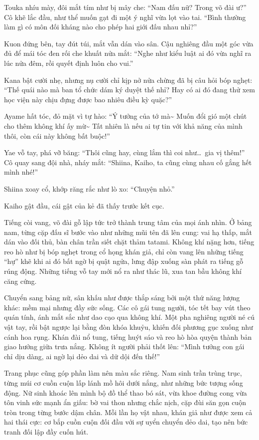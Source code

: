 \documentclass[../main.tex]{subfiles}
\begin{document}
Touka nhíu mày, đôi mắt tím như bị mây che: ``Nam đấu nữ? Trong võ đài ư?'' Cô khẽ lắc đầu, như thể muốn gạt đi một ý nghĩ vừa lọt vào tai. ``Bình thường làm gì có môn đối kháng nào cho phép hai giới đấu  nhau nhỉ?''

Kuon đứng bên, tay đút túi, mắt vẫn dán vào sân. Cậu nghiêng đầu một góc vừa đủ để mái tóc đen rối che khuất nửa mắt: ``Nghe như kiểu luật ai đó vừa nghĩ ra lúc nửa đêm, rồi quyết định luôn cho vui.''

Kana bật cười nhẹ, nhưng nụ cười chỉ kịp nở nửa chừng đã bị câu hỏi bóp nghẹt: ``Thế quái nào mà ban tổ chức dám ký duyệt thế nhỉ? Hay có ai đó đang thử xem học viện này chịu đựng được bao nhiêu điều kỳ quặc?''

Ayame hất tóc, đỏ mặt vì tự hào: ``Ý tưởng của tớ mà\~{} Muốn đổi gió một chút cho thêm không khí ấy mừ\~{} Tất nhiên là nếu ai tự tin với khả năng của mình thôi, còn cái này không bất buộc!''

Yae vỗ tay, phá vỡ băng: ``Thôi cũng hay, cùng lắm thì coi như\dots\ gia vị thêm!'' Cô quay sang đội nhà, nháy mắt: ``Shiina, Kaiho, ta cũng cùng nhau cố gắng hết mình nhé!''

Shiina xoay cổ, khớp răng rắc như lò xo: ``Chuyện nhỏ.''

Kaiho gật đầu, cái gật của kẻ đã thấy trước kết cục.

\ct

Tiếng còi vang, võ đài gỗ lập tức trở thành trung tâm của mọi ánh nhìn. Ở bảng nam, từng cặp đấu sĩ bước vào như những mũi tên đã lên cung: vai hạ thấp, mắt dán vào đối thủ, bàn chân trần siết chặt thảm tatami. Không khí nặng hơn, tiếng reo hò như bị bóp nghẹt trong cổ họng khán giả, chỉ còn vang lên những tiếng ``hự'' khẽ khi ai đó bất ngờ bị quật ngửa, lưng đập xuống sàn phát ra tiếng gỗ rúng động. Những tiếng vỗ tay mới nổ ra như thác lũ, xua tan bầu không khí căng cứng.

Chuyển sang bảng nữ, sân khấu như được thắp sáng bởi một thứ năng lượng khác: mềm mại nhưng đầy sức sống. Các cô gái tung người, tóc tết bay vút theo quán tính, ánh mắt sắc như dao cạo qua không khí. Một pha nghiêng người né cú vật tay, rồi bật ngược lại bằng đòn khóa khuỷu, khiến đối phương gục xuống như cánh hoa rụng. Khán đài nổ tung, tiếng huýt sáo và reo hò hòa quyện thành bản giao hưởng giữa trưa nắng. Không ít người phải thốt lên: ``Mình tưởng con gái chỉ dịu dàng, ai ngờ lại dẻo dai và dữ dội đến thế!''

Trang phục cũng góp phần làm nên màu sắc riêng. Nam sinh trần trùng trục, từng múi cơ cuồn cuộn lấp lánh mồ hôi dưới nắng, như những bức tượng sống động. Nữ sinh khoác lên mình bộ đồ thể thao bó sát, vừa khoe đường cong vừa tôn vinh sức mạnh ẩn giấu: bờ vai thon nhưng chắc nịch, cặp đùi săn gọn cuộn tròn trong từng bước dậm chân. Mỗi lần họ vật nhau, khán giả như được xem cả hai thái cực: cơ bắp cuồn cuộn đối đầu với sự uyển chuyển dẻo dai, tạo nên bức tranh đối lập đầy cuốn hút.
\end{document}
